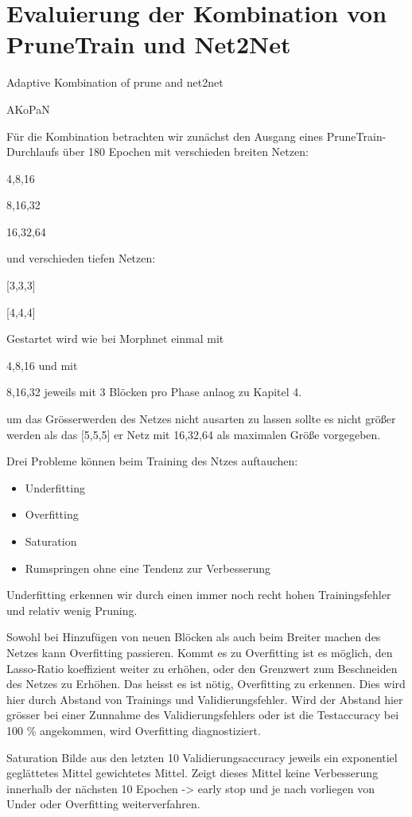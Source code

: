 \chapter{Evaluierung der Kombination von PruneTrain und Net2Net }\label{sec:ptpnet2net}
Adaptive Kombination of prune and net2net

AKoPaN

Für die Kombination betrachten wir zunächst den Ausgang eines PruneTrain-Durchlaufs über 180 Epochen mit verschieden breiten Netzen:

4,8,16


8,16,32


16,32,64


und verschieden tiefen Netzen:

[3,3,3]


[4,4,4]




Gestartet wird wie bei Morphnet einmal mit 


4,8,16 und mit 


8,16,32
jeweils mit 3 Blöcken pro Phase
anlaog zu Kapitel 4.


um das Grösserwerden des Netzes nicht ausarten zu lassen sollte es nicht größer werden als 
das [5,5,5] er Netz mit 16,32,64 als maximalen Größe vorgegeben.




Drei Probleme können beim Training des Ntzes auftauchen:
\begin{itemize}
 \item Underfitting
 \item Overfitting
 \item Saturation
 \item Rumspringen ohne eine Tendenz zur Verbesserung
\end{itemize}

Underfitting erkennen wir durch einen immer noch recht hohen Trainingsfehler und relativ wenig Pruning.


Sowohl bei Hinzufügen von neuen Blöcken als auch beim Breiter machen des Netzes kann Overfitting passieren. Kommt es zu Overfitting ist es möglich, den Lasso-Ratio koeffizient weiter zu erhöhen, oder den Grenzwert zum Beschneiden des Netzes zu Erhöhen. Das heisst es ist nötig, Overfitting zu erkennen. Dies wird hier durch Abstand von Trainings und Validierungsfehler. Wird der Abstand hier grösser bei einer Zunnahme des Validierungsfehlers oder  ist die Testaccuracy bei 100 \% angekommen, wird Overfitting diagnostiziert.


Saturation
Bilde aus den letzten 10 Validierungsaccuracy jeweils ein exponentiel geglättetes Mittel gewichtetes Mittel. Zeigt dieses Mittel keine Verbesserung innerhalb der nächsten 10 Epochen -> early stop und je nach vorliegen von Under oder Overfitting weiterverfahren.



